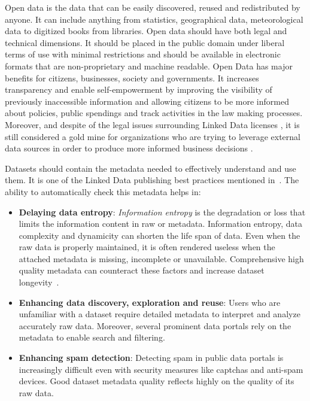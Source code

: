 \documentclass[runningheads,a4paper]{llncs}
\begin{document}
Open data is the data that can be easily discovered, reused and redistributed by anyone. It can include anything from statistics, geographical data, meteorological data to digitized books from libraries. Open data should have both legal and technical dimensions. It should be placed in the public domain under liberal terms of use with minimal restrictions and should be available in electronic formats that are non-proprietary and machine readable. Open Data has major benefits for citizens, businesses, society and governments. It increases transparency and enable self-empowerment by improving the visibility of previously inaccessible information and allowing citizens to be more informed about policies, public spendings and track activities in the law making processes. Moreover, and despite of the legal issues surrounding Linked Data licenses \cite{nomoneyLOD}, it is still considered a gold mine for organizations who are trying to leverage external data sources in order to produce more informed business decisions \cite{Boyd2011}.

Datasets should contain the metadata needed to effectively understand and use them. It is one of the Linked Data publishing best practices mentioned in~\cite{Bizer:2011:EWG:2075914.2075915}. The ability to automatically check this metadata helps in:

\begin{itemize}
  \item \textbf{Delaying data entropy}: \textit{Information entropy} is the degradation or loss that limits the information content in raw or metadata. Information entropy, data complexity and dynamicity can shorten the life span of data. Even when the raw data is properly maintained, it is often rendered useless when the attached metadata is missing, incomplete or unavailable. Comprehensive high quality metadata can counteract these factors and increase dataset longevity~\cite{GTOS}.
  \item \textbf{Enhancing data discovery, exploration and reuse}: Users who are unfamiliar with a dataset require detailed metadata to interpret and analyze accurately raw data. Moreover, several prominent data portals rely on the metadata to enable search and filtering.
  \item \textbf{Enhancing spam detection}: Detecting spam in public data portals is increasingly difficult  even with security measures like captchas and anti-spam devices. Good dataset metadata quality reflects highly on the quality of its raw data.
\end{itemize}
\end{document}
